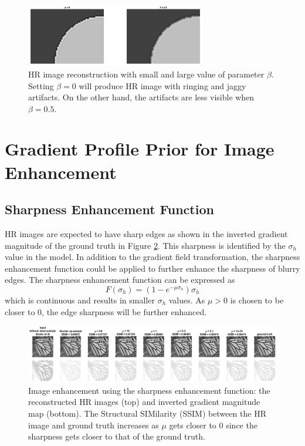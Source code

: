 \documentclass[a4paper,11pt]{article}
\begin{document}
\begin{figure}[H]
	\centering
	\includegraphics[width=0.7\textwidth]{beta 0 05.png}
	\caption{HR image reconstruction with small and large value of parameter $\beta$. Setting $\beta = 0$ will produce HR image with ringing and jaggy artifacts. On the other hand, the artifacts are less visible when $\beta = 0.5$.}
	\label{fig:beta2}
\end{figure}

\section{Gradient Profile Prior for Image Enhancement}

\subsection{Sharpness Enhancement Function}

HR images are expected to have sharp edges as shown in the inverted gradient magnitude of the ground truth in Figure \ref{fig:mu}. This sharpness is identified by the $\sigma_h$ value in the model. In addition to the gradient field transformation, the sharpness enhancement function could be applied to further enhance the sharpness of blurry edges. The sharpness enhancement function can be expressed as
\begin{equation}
	F(\sigma_h) = (1-e^{-\mu\sigma_h})\sigma_h
\end{equation}
which is continuous and results in smaller $\sigma_h$ values. As $\mu > 0$ is chosen to be closer to 0, the edge sharpness will be further enhanced.

\begin{figure}[H]
	\centering
	\includegraphics[width=1\textwidth]{mu.png}
	\caption{Image enhancement using the sharpness enhancement function: the reconstructed HR images (top) and inverted gradient magnitude map (bottom). The Structural SIMilarity (SSIM) \cite{ssim04} between the HR image and ground truth increases as $\mu$ gets closer to 0 since the sharpness gets closer to that of the ground truth.}
	\label{fig:mu}
\end{figure}
\end{document}

